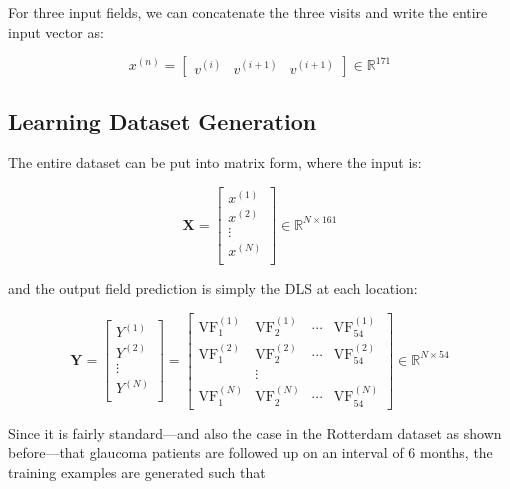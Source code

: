 For three input fields, we can concatenate the three visits and write the entire input vector as: 

\begin{equation}
x^{(n)} = \begin{bmatrix}
v^{(i)} & v^{(i+1)} & v^{(i+1)}
\end{bmatrix}
\in \mathbb{R}^{171}
\end{equation}

\subsection{Learning Dataset Generation}

The entire dataset can be put into matrix form, where the input is:

\begin{equation}
\mathbf{X} = \begin{bmatrix}
x^{(1)} \\
x^{(2)} \\
\vdots \\
x^{(N)} \\
\end{bmatrix}
\in \mathbb{R}^{N\times 161}
\end{equation}

and the output field prediction is simply the \ac{DLS} at each location:

\begin{equation}
\mathbf{Y} = \begin{bmatrix}
Y^{(1)} \\
Y^{(2)} \\
\vdots \\
Y^{(N)} \\
\end{bmatrix}
= \begin{bmatrix}
\textrm{VF}_1^{(1)} & \textrm{VF}_2^{(1)} & \cdots & \textrm{VF}_{54}^{(1)} \\
\textrm{VF}_1^{(2)} & \textrm{VF}_2^{(2)} & \cdots & \textrm{VF}_{54}^{(2)} \\
& \vdots & & \\
\textrm{VF}_1^{(N)} & \textrm{VF}_2^{(N)} & \cdots & \textrm{VF}_{54}^{(N)}
\end{bmatrix}
\in \mathbb{R}^{N\times 54}
\end{equation}

Since it is fairly standard---and also the case in the Rotterdam dataset as shown before---that glaucoma patients are followed up on an interval of 6 months, the training examples are generated such that

